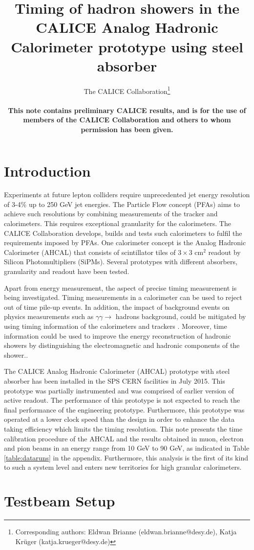 \documentclass{JINST}
\title{Timing of hadron showers in the CALICE Analog Hadronic Calorimeter prototype using steel absorber}
\author{The CALICE Collaboration\thanks{Corresponding authors: Eldwan Brianne (eldwan.brianne@desy.de), Katja Kr\"uger (katja.krueger@desy.de) } \\
\vspace{10 mm}

{\rm \bf \normalsize This note contains preliminary CALICE results, and is for the use of members of the CALICE Collaboration and others to whom permission has been given.}
}
\begin{document}
\section{Introduction}

Experiments at future lepton colliders require unprecedented jet energy resolution of 3-4\% up to 250 GeV jet energies. The Particle Flow concept (PFAs) \cite{Thomson:2009rp} aims to achieve such resolutions by combining measurements of the tracker and calorimeters. This requires exceptional granularity for the calorimeters. The CALICE Collaboration develops, builds and tests such calorimeters to fulfil the requirements imposed by PFAs. One calorimeter concept is the Analog Hadronic Calorimeter (AHCAL) that consists of scintillator tiles of $3\times3$ cm$^2$ readout by Silicon Photomultipliers (SiPMs). Several prototypes with different absorbers, granularity and readout have been tested.

Apart from energy measurement, the aspect of precise timing measurement is being investigated. Timing measurements in a calorimeter can be used to reject out of time pile-up events. In addition, the impact of background events on physics measurements such as $\gamma\gamma \rightarrow$ hadrons background, could be mitigated by using timing information of the calorimeters and trackers \cite{Barklow:2016tza}. Moreover, time information could be used to improve the energy reconstruction of hadronic showers by distinguishing the electromagnetic and hadronic components of the shower.\cite{Benaglia2016}.

The CALICE Analog Hadronic Calorimeter (AHCAL) prototype \cite{Sefkow:316196, Krueger:205287} with steel absorber has been installed in the SPS CERN facilities in July 2015. This prototype was partially instrumented and was comprised of earlier version of active readout. The performance of this prototype is not expected to reach the final performance of the engineering prototype. Furthermore, this prototype was operated at a lower clock speed than the design in order to enhance the data taking efficiency which limits the timing resolution. This note presents the time calibration procedure of the AHCAL and the results obtained in muon, electron and pion beams in an energy range from 10 GeV to 90 GeV, as indicated in Table \ref{table:dataruns} in the appendix. Furthermore, this analysis is the first of its kind to such a system level and enters new territories for high granular calorimeters.

\section{Testbeam Setup}
\end{document}
